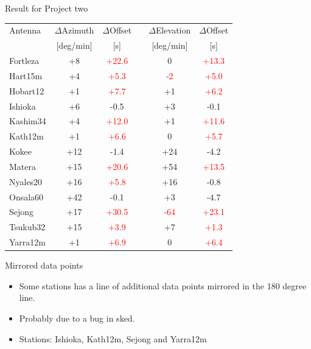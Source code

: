\documentclass{beamer}
\begin{document}
    \begin{frame}{Result for Project two}
        \begin{tabular}{l c c c c c}
            Antenna & $\Delta$Azimuth & $\Delta$Offset & & $\Delta$Elevation & $\Delta$Offset\\ [-8pt]
               & \tiny{[deg/min]}      & \tiny{[s]}            & & \tiny{[deg/min]} & \tiny{[s]} \\
            \hline
            Fortleza          & +8  & \textcolor{red}{+22.6} &  & 0  &\textcolor{red}{+13.3}  \\
            Hart15m           & +4  & \textcolor{red}{+5.3}  &  & \textcolor{red}{-2} &\textcolor{red}{+5.0}   \\
            Hobart12          & +1  & \textcolor{red}{+7.7}  &  & +1&\textcolor{red}{+6.2}   \\
            Ishioka           & +6  & -0.5  &  & +3 & -0.1   \\
            Kashim34          & +4  & \textcolor{red}{+12.0} &  & +1 &\textcolor{red}{+11.6}  \\
            Kath12m           & +1  & \textcolor{red}{+6.6}  &  & 0 &\textcolor{red}{+5.7}   \\
            Kokee             & +12 & -1.4  &  & +24&-4.2   \\
            Matera            & +15 & \textcolor{red}{+20.6} &  & +54&\textcolor{red}{+13.5}  \\
            Nyales20          & +16 & \textcolor{red}{+5.8}  &  & +16& -0.8  \\
            Onsala60          & +42 & -0.1  &  & +3 &-4.7   \\
            Sejong            & +17 & \textcolor{red}{+30.5} &  &\textcolor{red}{-64}& \textcolor{red}{+23.1}  \\
            Tsukub32          & +15 & \textcolor{red}{+3.9}  &  & +7 &\textcolor{red}{+1.3}   \\
            Yarra12m          & +1  & \textcolor{red}{+6.9}  &  & 0  &\textcolor{red}{+6.4}   \\
        \end{tabular}
    \end{frame}
    \begin{frame}{Mirrored data points}
        \begin{itemize}[<+-|alert@+>]
            \item Some stations has a line of additional data points mirrored
            in the 180 degree line.
            \item Probably due to a bug in sked.
            \item Stations: Ishioka, Kath12m, Sejong and Yarra12m
        \end{itemize}
    \end{frame}
\end{document}
